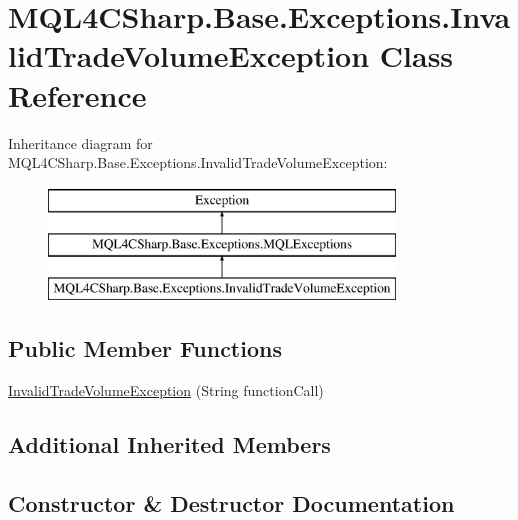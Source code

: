 \hypertarget{class_m_q_l4_c_sharp_1_1_base_1_1_exceptions_1_1_invalid_trade_volume_exception}{}\section{M\+Q\+L4\+C\+Sharp.\+Base.\+Exceptions.\+Invalid\+Trade\+Volume\+Exception Class Reference}
\label{class_m_q_l4_c_sharp_1_1_base_1_1_exceptions_1_1_invalid_trade_volume_exception}
Inheritance diagram for M\+Q\+L4\+C\+Sharp.\+Base.\+Exceptions.\+Invalid\+Trade\+Volume\+Exception\+:\begin{figure}[H]
\begin{center}
\leavevmode
\includegraphics[height=3.000000cm]{class_m_q_l4_c_sharp_1_1_base_1_1_exceptions_1_1_invalid_trade_volume_exception}
\end{center}
\end{figure}
\subsection*{Public Member Functions}
\begin{DoxyCompactItemize}
\item 
\hyperlink{class_m_q_l4_c_sharp_1_1_base_1_1_exceptions_1_1_invalid_trade_volume_exception_a7a2e2c7a5029cd078020c1847fde0d4a}{Invalid\+Trade\+Volume\+Exception} (String function\+Call)
\end{DoxyCompactItemize}
\subsection*{Additional Inherited Members}


\subsection{Constructor \& Destructor Documentation}
